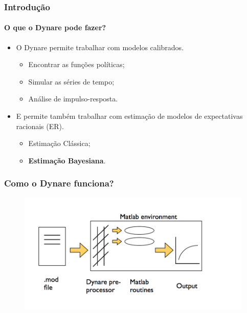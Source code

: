 \documentclass[xcolor=pdftex,dvipsnames,table]{beamer}
\newcommand{\ft}{\frametitle}
\begin{document}
\begin{frame}
\ft{Introdução}
\framesubtitle{O que o Dynare pode fazer?}
\begin{itemize}

\item O Dynare permite trabalhar com modelos calibrados.
	
	\begin{itemize}
	\item Encontrar as funções políticas;
	
	\item Simular as séries de tempo;
	
	\item Análise de impulso-resposta.
	\end{itemize}
\pause
\item E permite também trabalhar com estimação de modelos de expectativas racionais (ER).

	\begin{itemize}
	\item Estimação Clássica;
	\item \textbf{Estimação Bayesiana}.
	\end{itemize}

\end{itemize}
\end{frame}


\begin{frame}[fragile]
\ft{Como o Dynare funciona?}

\begin{figure}[h!]
\includegraphics[scale=0.35]{fig0.png}
\label{fig1}
\end{figure}

\end{frame}
\end{document}
